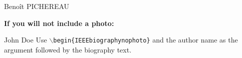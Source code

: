 \documentclass[lettersize,journal]{IEEEtran}
\begin{document}
\vspace{11pt}

\begin{IEEEbiography}{Benoît PICHEREAU}

\end{IEEEbiography}

\vspace{11pt}

\bf{If you will not include a photo:}\vspace{-33pt}
\begin{IEEEbiographynophoto}{John Doe}
Use $\backslash${\tt{begin\{IEEEbiographynophoto\}}} and the author name as the argument followed by the biography text.
\end{IEEEbiographynophoto}




\vfill
\end{document}
